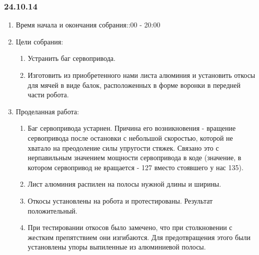 
\subsubsection{24.10.14}

\begin{enumerate}
	\item Время начала и окончания собрания::00 - 20:00
	\item Цели собрания:\newline
	\begin{enumerate}
	  \item Устранить баг сервопривода.\newline
	  
	  \item Изготовить из приобретенного нами листа алюминия и установить откосы для мячей в виде балок, расположенных в форме воронки в передней части робота.\newline
	  
    \end{enumerate}
    
	\item Проделанная работа:\newline
	\begin{enumerate}
	  \item Баг сервопривода устарнен. Причина его возникновения - вращение сервопривода после остановки с небольшой скоростью, которой не хватало на преодоление силы упругости стяжек. Связано это с нерпавильным значением мощности сервопривода в коде (значение, в котором сервопривод не вращается - 127 вместо стоявшего у нас 135).\newline
      
      \item Лист алюминия распилен на полосы нужной длины и ширины.\newline
      
      \item Откосы установлены на робота и протестированы. Результат положительный.\newline
      
      \item При тестировании откосов было замечено, что при столкновении с жестким препятствием они изгибаются. Для предотвращения этого были установлены упоры выпиленные из алюминиевой полосы.\newline
      

\end{enumerate}
\end{enumerate}

